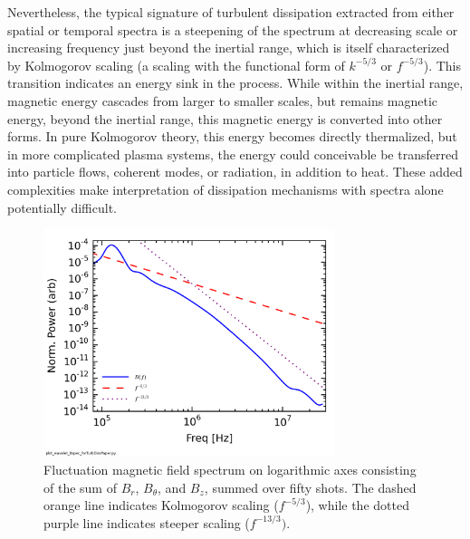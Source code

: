 \documentclass[aip,pop,amsmath,amssymb,preprint,superscriptaddress]{revtex4-1} %
\begin{document}
Nevertheless, the typical signature of turbulent dissipation extracted from either spatial or temporal spectra is a steepening of the spectrum at decreasing scale or increasing frequency just beyond the inertial range, which is itself characterized by Kolmogorov scaling (a scaling with the functional form of $k^{-5/3}$ or $f^{-5/3}$). This transition indicates an energy sink in the process. While within the inertial range, magnetic energy cascades from larger to smaller scales, but remains magnetic energy, beyond the inertial range, this magnetic energy is converted into other forms. In pure Kolmogorov theory, this energy becomes directly thermalized, but in more complicated plasma systems, the energy could conceivable be transferred into particle flows, coherent modes, or radiation, in addition to heat. These added complexities make interpretation of dissipation mechanisms with spectra alone potentially difficult. 

\begin{figure}
\centerline{
\includegraphics[width=8.5cm]{figure2.jpg}}
\caption{\label{fig:spectra} Fluctuation magnetic field spectrum on logarithmic axes consisting of the sum of $B_r$, $B_{\theta}$, and $B_z$, summed over fifty shots. The dashed orange line indicates Kolmogorov scaling ($f^{-5/3}$), while the dotted purple line indicates steeper scaling ($f^{-13/3})$.}
\end{figure}
\end{document}
